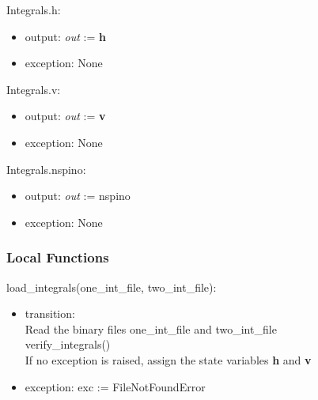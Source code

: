 \documentclass[12pt, titlepage]{article}
\begin{document}
\noindent Integrals.h:
\begin{itemize}
	\item output: \textit{out} := \textbf{h} 
	\item exception: None 
\end{itemize}

\noindent Integrals.v:
\begin{itemize}
	\item output: \textit{out} := \textbf{v} 
	\item exception: None 
\end{itemize}

\noindent Integrals.nspino:
\begin{itemize}
	\item output: \textit{out} := nspino 
	\item exception: None 
\end{itemize}

%

\subsubsection{Local Functions}

\noindent load\_integrals(one\_int\_file, two\_int\_file):
\begin{itemize}
	\item transition: \\
	Read the binary files one\_int\_file and 
	two\_int\_file \\
	verify\_integrals()\\
	If no exception is raised, assign the state variables \textbf{h} and 
	\textbf{v}	
	\item exception: exc := FileNotFoundError
\end{itemize}
\end{document}
